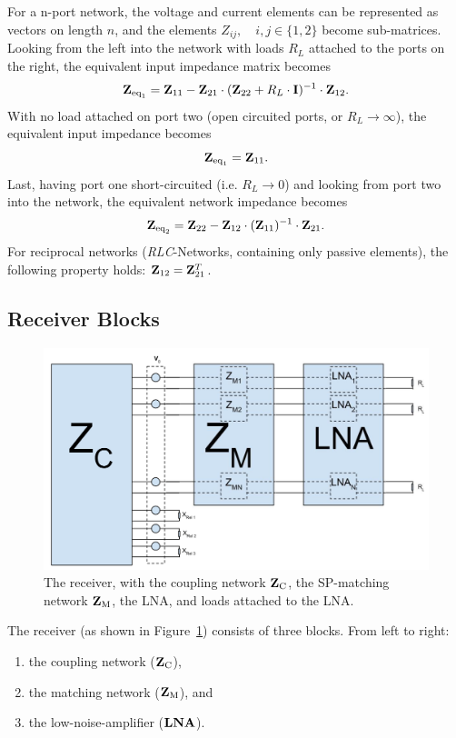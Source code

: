 For a n-port network, the voltage and current elements can be represented as vectors on length $n$, and the elements $Z_{ij},\quad i,j\in\{1,2\}$ become sub-matrices.
Looking from the left into the network with loads $R_L$ attached to the ports on the right, the equivalent input impedance matrix becomes
\begin{equation}
\label{eq:eq_imp_load}
\mathbf{Z}_{\text{eq}_1} = \mathbf{Z}_{11} - \mathbf{Z}_{21}\cdot(\mathbf{Z}_{22} + R_L\cdot\mathbf{I})^{-1}\cdot \mathbf{Z}_{12}.
\end{equation}
With no load attached on port two (open circuited ports, or $R_L\rightarrow\infty$), the equivalent input impedance becomes
\begin{equation}
\label{eq:eq_imp_oc}
\mathbf{Z}_{\text{eq}_1} = \mathbf{Z}_{11}.
\end{equation}
Last, having port one short-circuited (i.e.  $R_L\rightarrow 0$) and looking from port two into the network, the equivalent network impedance becomes
\begin{equation}
\label{eq:eq_imp_sc}
\mathbf{Z}_{\text{eq}_2} = \mathbf{Z}_{22} - \mathbf{Z}_{12}\cdot(\mathbf{Z}_{11})^{-1}\cdot \mathbf{Z}_{21}.
\end{equation}
For reciprocal networks (\textit{RLC}-Networks, containing only passive elements), the following property holds: $\mathbf{Z}_{12} = \mathbf{Z}_{21}^T$.


\subsection{Receiver Blocks}
\begin{figure}[h]
\centering
  \includegraphics[width=0.9\linewidth]{images/Full_Receiver.png}
\caption{The receiver, with the coupling network $\mathbf{Z}_\text{C}$, the SP-matching network $\mathbf{Z}_\text{M}$, the LNA, and loads attached to the LNA.}
\label{fig:receiver}
\end{figure}
The receiver (as shown in Figure~\ref{fig:receiver}) consists of three blocks.
From left to right:
\begin{enumerate}
\item{the coupling network ($\mathbf{Z}_\text{C}$),}
\item{the matching network ($\mathbf{Z}_\text{M}$), and}
\item{the low-noise-amplifier ($\mathbf{LNA}$).}
\end{enumerate}
 
